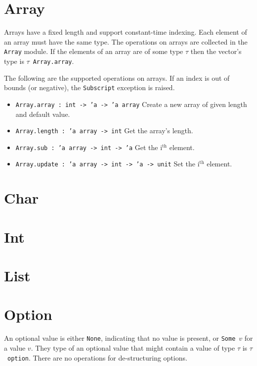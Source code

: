 \documentclass[12pt,a4paper]{book}
\begin{document}
\section{Array}
\label{sect:array}

Arrays have a fixed length and support constant-time indexing. Each element of an array must have the same type. The operations on arrays are collected in the \texttt{Array} module. If the elements of an array are of some type $\tau$ then the vector's type is $\tau$\ \texttt{Array.array}.

The following are the supported operations on arrays. If an index is out of bounds (or negative), the \texttt{Subscript} exception is raised.
\begin{itemize}
\item \texttt{Array.array : int -> 'a -> 'a array} Create a new array of given length and default value.
\item \texttt{Array.length : 'a array -> int} Get the array's length.
\item \texttt{Array.sub : 'a array -> int -> 'a} Get the i$^\textrm{th}$ element.
\item \texttt{Array.update : 'a array -> int -> 'a -> unit} Set the i$^\textrm{th}$ element.
\end{itemize}

\section{Char}
\label{sect:char}

\section{Int}

\section{List}
\label{sect:list}

\section{Option}
\label{sect:option}

An optional value is either \texttt{None}, indicating that no value is present, or \texttt{Some}\ $v$ for a value $v$. They type of an optional value that might contain a value of type $\tau$ is $\tau$\ \texttt{option}. There are no operations for de-structuring options.
\end{document}
